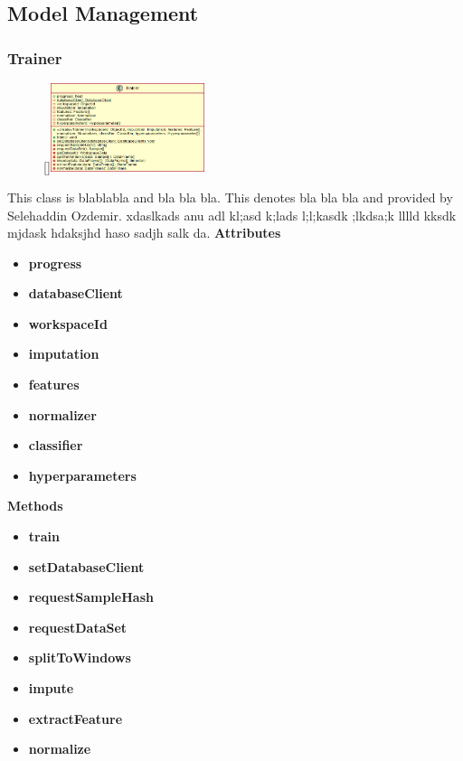 \subsection{Model Management}

\subsubsection{Trainer}
\label{Trainer}
\begin{figure}
    \raisebox{0pt}[\dimexpr{}\baselineskip\relax]{\includegraphics[width=4.5cm]{classes/model-management/1.png}}
\end{figure} 
\par
This class is blablabla and bla bla bla. This denotes bla bla bla and provided by Selehaddin Ozdemir. xdaslkads anu adl kl;asd k;lads l;l;kasdk ;lkdsa;k lllld kksdk mjdask hdaksjhd haso sadjh salk da.
\newline
\newline
\textbf{Attributes}
\begin{itemize}
    \item \textbf{progress}
    \item \textbf{databaseClient}
    \item \textbf{workspaceId}
    \item \textbf{imputation}
    \item \textbf{features}
    \item \textbf{normalizer}
    \item \textbf{classifier}
    \item \textbf{hyperparameters}
\end{itemize}
\textbf{Methods}
\begin{itemize}
    \item \textbf{train}
    \item \textbf{setDatabaseClient}
    \item \textbf{requestSampleHash}
    \item \textbf{requestDataSet}
    \item \textbf{splitToWindows}
    \item \textbf{impute}
    \item \textbf{extractFeature}
    \item \textbf{normalize}
\end{itemize}

